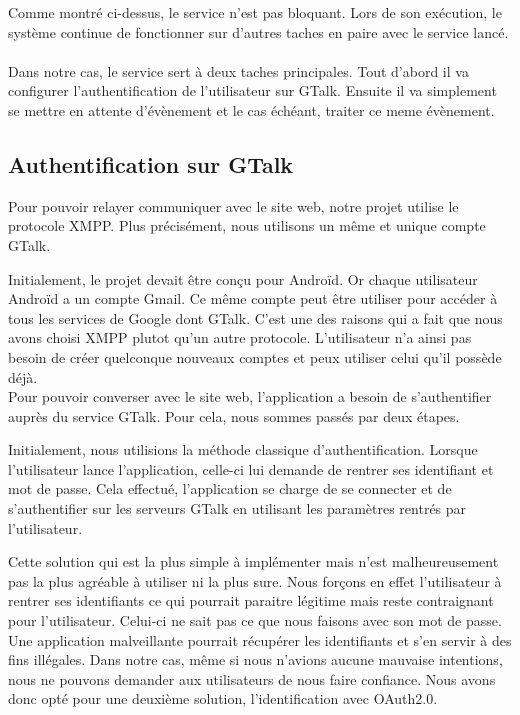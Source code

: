 Comme montré ci-dessus, le service n'est pas  bloquant. Lors de son exécution, le système continue de 
fonctionner sur d'autres taches en paire avec le service lancé.
\\\\
Dans notre cas, le service sert à deux taches principales. Tout d'abord il va configurer l'authentification
de l'utilisateur sur GTalk. Ensuite il va simplement se mettre en attente d'évènement et le cas échéant, 
traiter ce meme évènement.
\\



\subsection{Authentification sur GTalk}



Pour pouvoir relayer communiquer avec le site web, notre projet utilise le protocole XMPP. Plus 
précisément, nous utilisons un même et unique compte GTalk. 

Initialement, le projet devait être conçu pour Androïd. Or chaque utilisateur Androïd a un compte 
Gmail. Ce même compte peut être utiliser pour accéder à tous les services de Google dont GTalk.
C'est une des raisons qui a fait que nous avons choisi XMPP plutot qu'un autre protocole. L'utilisateur
n'a ainsi pas besoin de créer quelconque nouveaux comptes et peux utiliser celui qu'il possède déjà.
\\


Pour pouvoir converser avec le site web, l'application a besoin de s'authentifier auprès du service
GTalk. Pour cela, nous sommes passés par deux étapes. 

Initialement, nous utilisions la méthode classique d'authentification. Lorsque l'utilisateur lance 
l'application, celle-ci lui demande de rentrer ses identifiant et mot de passe. Cela effectué, 
l'application se charge de se connecter et de s'authentifier sur les serveurs GTalk en utilisant les
paramètres rentrés par l'utilisateur.

Cette solution qui est la plus simple à implémenter mais n'est malheureusement pas la plus agréable
à utiliser ni la plus sure. Nous forçons en effet l'utilisateur à rentrer ses identifiants ce qui 
pourrait paraitre légitime mais reste contraignant pour l'utilisateur. Celui-ci ne sait pas ce que 
nous faisons avec son mot de passe. Une application malveillante pourrait récupérer les identifiants
et s'en servir à des fins illégales. Dans notre cas, même si nous n'avions aucune mauvaise intentions,
nous ne pouvons demander aux utilisateurs de nous faire confiance. Nous avons donc opté pour une 
deuxième solution, l'identification avec OAuth2.0.

